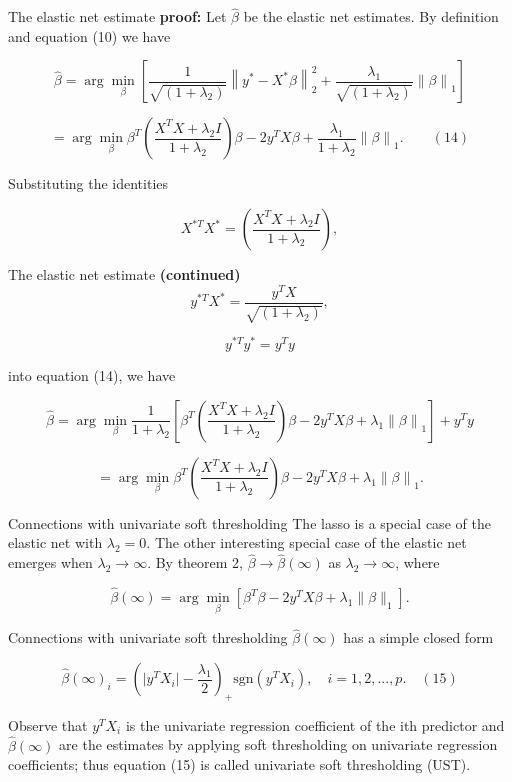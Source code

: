 \begin{frame}{The elastic net estimate}
\textbf{proof:}
    Let \( \hat{\beta} \) be the elastic net estimates. By definition and equation (10) we have

$$
\hat{\beta} = \arg\min_{\beta} \left[ \frac{1}{\sqrt{(1 + \lambda_2)}} \left\| y^* - X^* \beta \right\|_2^2 + \frac{\lambda_1}{\sqrt{(1 + \lambda_2)}} \left\| \beta \right\|_1 \right]
$$

$$
= \arg\min_{\beta} \beta^T \left( \frac{X^TX + \lambda_2 I}{1 + \lambda_2} \right) \beta - 2 y^T X\beta + \frac{\lambda_1}{1 + \lambda_2} \left\| \beta \right\|_1. \qquad (14)
$$

Substituting the identities

$$
X^{*T} X^* = \left( \frac{X^TX + \lambda_2 I}{1 + \lambda_2} \right),
$$


\end{frame}

\begin{frame}{The elastic net estimate}
   \textbf{(continued)} $$
y^{*T} X^* = \frac{y^TX}{\sqrt{(1 + \lambda_2)}},
$$

$$
y^{*T} y^* = y^T y
$$

into equation (14), we have

$$
\hat{\beta} = \arg\min_{\beta} \frac{1}{1 + \lambda_2} \left[ \beta^T \left( \frac{X^TX + \lambda_2 I}{1 + \lambda_2} \right) \beta - 2 y^TX\beta + \lambda_1 \left\| \beta \right\|_1 \right] + y^T y
$$

$$
= \arg\min_{\beta} \beta^T \left( \frac{X^TX + \lambda_2 I}{1 + \lambda_2} \right) \beta - 2 y^TX\beta + \lambda_1 \left\| \beta \right\|_1.
$$
\end{frame}

\begin{frame}{Connections with univariate soft thresholding}
The lasso is a special case of the elastic net with \( \lambda_2 = 0 \). The other interesting special case of the elastic net emerges when \( \lambda_2 \to \infty \). By theorem 2, \( \hat{\beta} \to \hat{\beta}(\infty) \) as \( \lambda_2 \to \infty \), where

$$
\hat{\beta}(\infty) = \arg\min_{\beta} \left[ \beta^T \beta - 2y^T X\beta + \lambda_1 \lVert \beta \rVert_1 \right].
$$
\end{frame}

\begin{frame}{Connections with univariate soft thresholding}
   \( \hat{\beta}(\infty) \) has a simple closed form

$$
\hat{\beta}(\infty)_i = \left( \lvert y^T X_i \rvert - \frac{\lambda_1}{2} \right)_+ \text{sgn}(y^T X_i), \quad i=1,2,...,p. \quad (15)
$$

Observe that \( y^T X_i \) is the univariate regression coefficient of the ith predictor and \( \hat{\beta}(\infty) \) are the estimates by applying soft thresholding on univariate regression coefficients; thus equation (15) is called univariate soft thresholding (UST). 
\end{frame}

